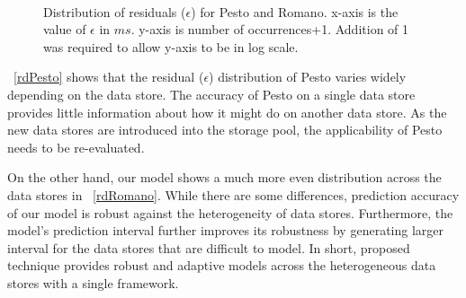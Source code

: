 \begin{figure}[!t]
\centering
{}\\
\captionsetup{format=myformat}
\caption{Distribution of residuals ($\epsilon$) for Pesto and Romano.
x-axis is the value of $\epsilon$ in $ms$.
y-axis is number of occurrences+1.
Addition of 1 was required to allow y-axis to be in log scale.
}
\label{residualDist}
\end{figure}
\figurename~\ref{rdPesto} shows that the residual ($\epsilon$) distribution of Pesto varies widely depending on the data store.
The accuracy of Pesto on a single data store provides little information about how it might do on another data store.
As the new data stores are introduced into the storage pool, the applicability of Pesto needs to be re-evaluated.

On the other hand, our model shows a much more even distribution across the data stores in \figurename~\ref{rdRomano}.
While there are some differences, prediction accuracy of our model is robust against the heterogeneity of data stores.
Furthermore, the model's prediction interval further improves its robustness by generating larger interval for the data stores that are difficult to model.
In short, proposed technique provides robust and adaptive models across the heterogeneous data stores with a single framework.
